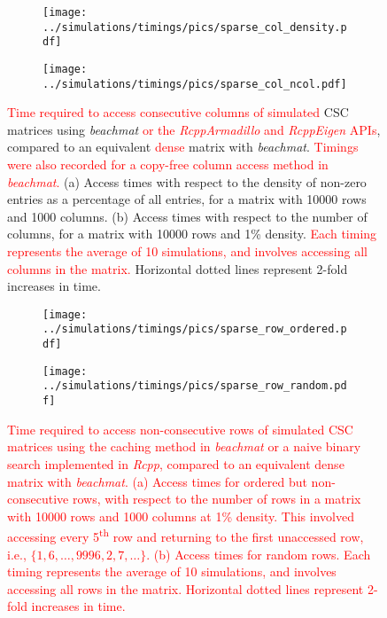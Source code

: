 \documentclass{article}
\newcommand{\beachmat}{\textit{beachmat}}
\newcommand{\revised}[1]{\textcolor{red}{#1}}
\begin{document}
\begin{figure}[bt]
    \centering
    \begin{subfigure}[b]{0.49\textwidth}
        \texttt{[image: ../simulations/timings/pics/sparse\_col\_density.pdf]}
        \caption{}
    \end{subfigure}
    \begin{subfigure}[b]{0.49\textwidth}
        \texttt{[image: ../simulations/timings/pics/sparse\_col\_ncol.pdf]}
        \caption{}
    \end{subfigure}
    \caption{\revised{Time required to access consecutive columns of simulated} CSC matrices using \beachmat{} \revised{or the \textit{RcppArmadillo} and \textit{RcppEigen} APIs}, compared to an equivalent \revised{dense} matrix with \beachmat{}.
        \revised{Timings were also recorded for a copy-free column access method in \beachmat{}.}
        (a) Access times with respect to the density of non-zero entries as a percentage of all entries, for a matrix with 10000 rows and 1000 columns.
        (b) Access times with respect to the number of columns, for a matrix with 10000 rows and 1\% density.
        \revised{Each timing represents the average of 10 simulations, and involves accessing all columns in the matrix.}
        Horizontal dotted lines represent 2-fold increases in time.
    }
    \label{fig:sparsecol}
\end{figure}

\begin{figure}[bt]
    \centering
    \begin{subfigure}[b]{0.49\textwidth}
        \texttt{[image: ../simulations/timings/pics/sparse\_row\_ordered.pdf]}
        \caption{}
    \end{subfigure}
    \begin{subfigure}[b]{0.49\textwidth}
        \texttt{[image: ../simulations/timings/pics/sparse\_row\_random.pdf]}
        \caption{}
    \end{subfigure}
    \caption{\revised{Time required to access non-consecutive rows of simulated CSC matrices using the caching method in \beachmat{} or a naive binary search implemented in \textit{Rcpp}, compared to an equivalent \revised{dense} matrix with \beachmat{}.
        (a) Access times for ordered but non-consecutive rows, with respect to the number of rows in a matrix with 10000 rows and 1000 columns at 1\% density.
        This involved accessing every 5\textsuperscript{th} row and returning to the first unaccessed row, i.e., $\{1, 6, \ldots, 9996, 2, 7, \ldots\}$.
        (b) Access times for random rows.
        Each timing represents the average of 10 simulations, and involves accessing all rows in the matrix.
Horizontal dotted lines represent 2-fold increases in time.}}
    \label{fig:sparsecolrandom}
\end{figure}
\end{document}
